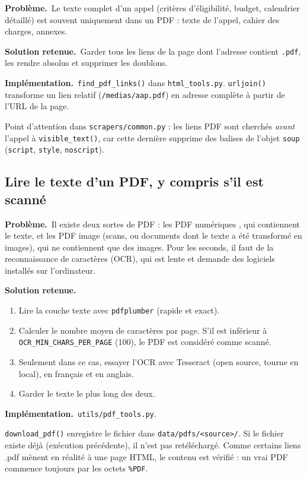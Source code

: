 \documentclass[11pt,a4paper]{article}
\newcommand{\pb}{\par\medskip\noindent\textbf{\textcolor{pbcolor}{Problème.}}\ }
\newcommand{\sol}{\par\medskip\noindent\textbf{\textcolor{solcolor}{Solution retenue.}}\ }
\newcommand{\impl}{\par\medskip\noindent\textbf{\textcolor{implcolor}{Implémentation.}}\ }
\newcommand{\code}[1]{\texttt{#1}}
\begin{document}
\pb Le texte complet d'un appel (critères d'éligibilité, budget, calendrier détaillé) est
souvent uniquement dans un PDF : texte de l'appel, cahier des charges, annexes.

\sol Garder tous les liens de la page dont l'adresse contient \code{.pdf}, les rendre
absolus et supprimer les doublons.

\impl \code{find\_pdf\_links()} dans \code{html\_tools.py}. \code{urljoin()} transforme
un lien relatif (\code{/medias/aap.pdf}) en adresse complète à partir de l'URL de la page.

Point d'attention dans \code{scrapers/common.py} : les liens PDF sont cherchés
\emph{avant} l'appel à \code{visible\_text()}, car cette dernière supprime des balises de
l'objet \code{soup} (\code{script}, \code{style}, \code{noscript}).

\subsection{Lire le texte d'un PDF, y compris s'il est scanné}

\pb Il existe deux sortes de PDF : les PDF \og numériques \fg, qui contiennent le texte, et
les PDF \og image \fg{} (scans, ou documents dont le texte a été transformé en images), qui ne
contiennent que des images. Pour les seconds, il faut de la reconnaissance de caractères
(OCR), qui est lente et demande des logiciels installés sur l'ordinateur.

\sol
\begin{enumerate}
  \item Lire la couche texte avec \code{pdfplumber} (rapide et exact).
  \item Calculer le nombre moyen de caractères par page. S'il est inférieur à
        \code{OCR\_MIN\_CHARS\_PER\_PAGE} (100), le PDF est considéré comme scanné.
  \item Seulement dans ce cas, essayer l'OCR avec Tesseract (open source, tourne en local),
        en français et en anglais.
  \item Garder le texte le plus long des deux.
\end{enumerate}

\impl \code{utils/pdf\_tools.py}.

\code{download\_pdf()} enregistre le fichier dans \code{data/pdfs/<source>/}. Si le fichier
existe déjà (exécution précédente), il n'est pas retéléchargé. Comme certains liens
\og .pdf \fg{} mènent en réalité à une page HTML, le contenu est vérifié : un vrai PDF
commence toujours par les octets \code{\%PDF}.
\end{document}
